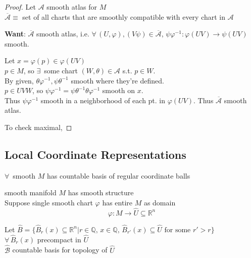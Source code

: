 \begin{proof}
Let $\mathcal{A}$ smooth atlas for $M$   \\
$\overline{ \mathcal{A} } \equiv $ set of all charts that are smoothly compatible with every chart in $\mathcal{A}$ 

\textbf{Want}: $\overline{ \mathcal{A}}$ smooth atlas, i.e. $\forall \, (U, \varphi), (V \psi) \in \overline{\mathcal{A}}$, $\psi \varphi^{-1} : \varphi(UV) \to \psi(UV)$ smooth.  

Let $x = \varphi(p) \in \varphi(UV)$ \\
$p\in M$, so $\exists \,$ some chart $(W, \theta) \in \mathcal{A}$ s.t. $p \in W$.  \\
By given, $\theta \varphi^{-1}, \psi \theta^{-1}$ smooth where they're defined.   \\
$p \in UVW$, so $\psi \varphi^{-1} = \psi \theta^{-1} \theta \varphi^{-1}$ smooth on $x$.  \\
Thus $\psi \varphi^{-1}$ smooth in a neighborhood of each pt. in $\varphi(UV)$.  Thus $\overline{\mathcal{A}}$ smooth atlas.  

To check maximal, 


\end{proof}




\subsection*{Local Coordinate Representations}

\begin{proposition}[1.19]
  $\forall \, $ smooth $M$ has countable basis of regular coordinate balls
\end{proposition}


smooth manifold $M$ has smooth structure \\
\quad Suppose single smooth chart $\varphi$ has entire $M$ as domain
\[
\varphi: M \to \widehat{U} \subseteq \mathbb{R}^n
\]

Let $\widehat{B} = \lbrace \widehat{B}_r(x) \subseteq \mathbb{R}^n | r \in \mathbb{Q}, \, x \in \mathbb{Q}, \, \widehat{B}_{r'}(x) \subseteq \widehat{U} \text{ for some } r' > r \rbrace$ \\

\quad $\forall \, \widehat{B}_r(x)$ precompact in $\widehat{U}$ \\
\quad $\widehat{\mathcal{B}}$ countable basis for topology of $\widehat{U}$

